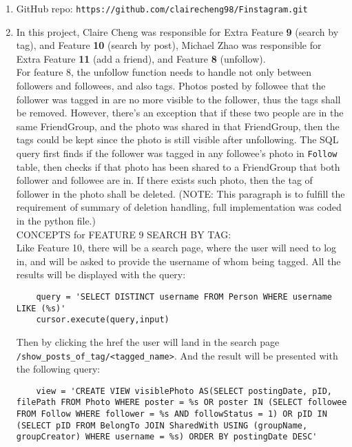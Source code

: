 \documentclass[12pt]{article}
\begin{document}
\begin{enumerate}[label=\textbf{\arabic*.}, leftmargin=*]
\item GitHub repo: \lstinline{https://github.com/clairecheng98/Finstagram.git}\\\vspace{10pt}
\item In this project, Claire Cheng was responsible for Extra Feature \textbf{9} (search by tag), and Feature \textbf{10} (search by post), Michael Zhao was responsible for Extra Feature \textbf{11} (add a friend), and Feature \textbf{8} (unfollow). \\\vspace{5pt}
For feature 8, the unfollow function needs to handle not only between followers and followees, and also tags. Photos posted by followee that the follower was tagged in are no more visible to the follower, thus the tags shall be removed. However, there's an exception that if these two people are in the same FriendGroup, and the photo was shared in that FriendGroup, then the tags could be kept since the photo is still visible after unfollowing. The SQL query first finds if the follower was tagged in any followee's photo in \lstinline{Follow} table, then checks if that photo has been shared to a FriendGroup that both follower and followee are in. If there exists such photo, then the tag of follower in the photo shall be deleted. (NOTE: This paragraph is to fulfill the requirement of summary of deletion handling, full implementation was coded in the python file.)\\\vspace{5pt}
CONCEPTS for FEATURE 9 SEARCH BY TAG: \\
Like Feature 10, there will be a search page, where the user will need to log in, and will be asked to provide the username of whom being tagged. All the results will be displayed with the query:
\begin{lstlisting}
    query = 'SELECT DISTINCT username FROM Person WHERE username LIKE (%s)'
    cursor.execute(query,input)
\end{lstlisting}
Then by clicking the href the user will land in the search page \lstinline{/show_posts_of_tag/<tagged_name>}. And the result will be presented with the following query:
\begin{lstlisting}
    view = 'CREATE VIEW visiblePhoto AS(SELECT postingDate, pID, filePath FROM Photo WHERE poster = %s OR poster IN (SELECT followee FROM Follow WHERE follower = %s AND followStatus = 1) OR pID IN (SELECT pID FROM BelongTo JOIN SharedWith USING (groupName, groupCreator) WHERE username = %s) ORDER BY postingDate DESC'

\end{lstlisting}
\end{enumerate}
\end{document}
